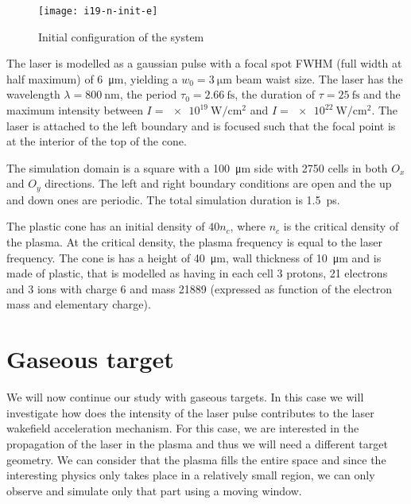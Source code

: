 \documentclass[12pt, class=report, crop=false]{standalone}
\begin{document}
\begin{figure}[hb]
    \centering
    \texttt{[image: i19-n-init-e]}
    \caption{Initial configuration of the system}%
    \label{fig:initial-plasma-laser}
\end{figure}

The laser is modelled as a gaussian pulse with a focal spot FWHM
(full width at half maximum) of \SI{6}{\micro\metre}, yielding
a \(w_0=\SI{3}{\micro\metre}\) beam waist size. The laser has the
wavelength \(\lambda=\SI{800}{\nano\metre}\), the period
\(\tau_0=\SI{2.66}{\femto\second}\), the duration of
\(\tau=\SI{25}{\femto\second}\) and the maximum intensity between
\(I=\SI{e19}{\watt\per\centi\metre\squared}\) and
\(I=\SI{e22}{\watt\per\centi\metre\squared}\).
The laser is attached to the left boundary and is focused such
that the focal point is at the interior of the top of the cone.

The simulation domain is a square with a \SI{100}{\micro\metre}
side with 2750 cells in both \(O_x\) and \(O_y\) directions.
The left and right boundary conditions are open and the up and
down ones are periodic. The total simulation duration is \SI{1.5}{\pico\second}.

The plastic cone has an initial density of \(40n_c\), where \(n_c\)
is the critical density of the plasma. At the critical density, the
plasma frequency is equal to the laser frequency. The cone is has a
height of \SI{40}{\micro\metre}, wall thickness of \SI{10}{\micro\metre} and is made of plastic, that is modelled as
having in each cell 3 protons, 21 electrons and 3 ions with charge
6 and mass 21889 (expressed as function of the electron mass and elementary charge).



\section{Gaseous target}

We will now continue our study with gaseous targets. In this case
we will investigate how does the intensity of the laser pulse
contributes to the laser wakefield acceleration mechanism.
For this case, we are interested in the propagation of the laser
in the plasma and thus we will need a different target geometry.
We can consider that the plasma fills the entire space and since
the interesting physics only takes place in a relatively small
region, we can only observe and simulate only that part using a moving window.
\end{document}
